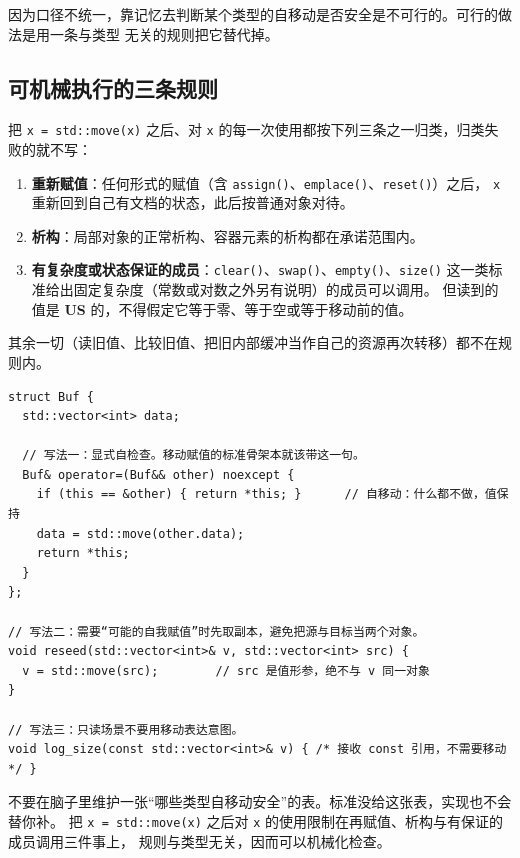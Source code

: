 \documentclass[12pt,a4paper,fontset=fandol]{ctexbook}
\newcommand{\Fn}[1]{\texttt{#1()}}
\newcommand{\Tp}[1]{\texttt{#1}}
\newcommand{\USB}{\textbf{\textsf{US}}}
\begin{document}
因为口径不统一，靠记忆去判断某个类型的自移动是否安全是不可行的。可行的做法是用一条与类型
无关的规则把它替代掉。

\subsection{可机械执行的三条规则}\label{sec:ub11-selfmove-rules}

把 \Tp{x = std::move(x)} 之后、对 \Tp{x} 的每一次使用都按下列三条之一归类，归类失败的就不写：

\begin{enumerate}
  \item \textbf{重新赋值}：任何形式的赋值（含 \Fn{assign}、\Fn{emplace}、\Fn{reset}）之后，
        \Tp{x} 重新回到自己有文档的状态，此后按普通对象对待。
  \item \textbf{析构}：局部对象的正常析构、容器元素的析构都在承诺范围内。
  \item \textbf{有复杂度或状态保证的成员}：\Fn{clear}、\Fn{swap}、\Fn{empty}、\Fn{size}
        这一类标准给出固定复杂度（常数或对数之外另有说明）的成员可以调用。
        但读到的值是 \USB{} 的，不得假定它等于零、等于空或等于移动前的值。
\end{enumerate}

其余一切（读旧值、比较旧值、把旧内部缓冲当作自己的资源再次转移）都不在规则内。

\begin{lstlisting}[style=cppstyle, caption={自移动的三种安全写法：自检查、先取副本、或压根不出现}]
struct Buf {
  std::vector<int> data;

  // 写法一：显式自检查。移动赋值的标准骨架本就该带这一句。
  Buf& operator=(Buf&& other) noexcept {
    if (this == &other) { return *this; }      // 自移动：什么都不做，值保持
    data = std::move(other.data);
    return *this;
  }
};

// 写法二：需要“可能的自我赋值”时先取副本，避免把源与目标当两个对象。
void reseed(std::vector<int>& v, std::vector<int> src) {
  v = std::move(src);        // src 是值形参，绝不与 v 同一对象
}

// 写法三：只读场景不要用移动表达意图。
void log_size(const std::vector<int>& v) { /* 接收 const 引用，不需要移动 */ }
\end{lstlisting}

\begin{guideline}[title={用规则替代记忆}]
不要在脑子里维护一张“哪些类型自移动安全”的表。标准没给这张表，实现也不会替你补。
把 \Tp{x = std::move(x)} 之后对 \Tp{x} 的使用限制在再赋值、析构与有保证的成员调用三件事上，
规则与类型无关，因而可以机械化检查。
\end{guideline}
\end{document}
